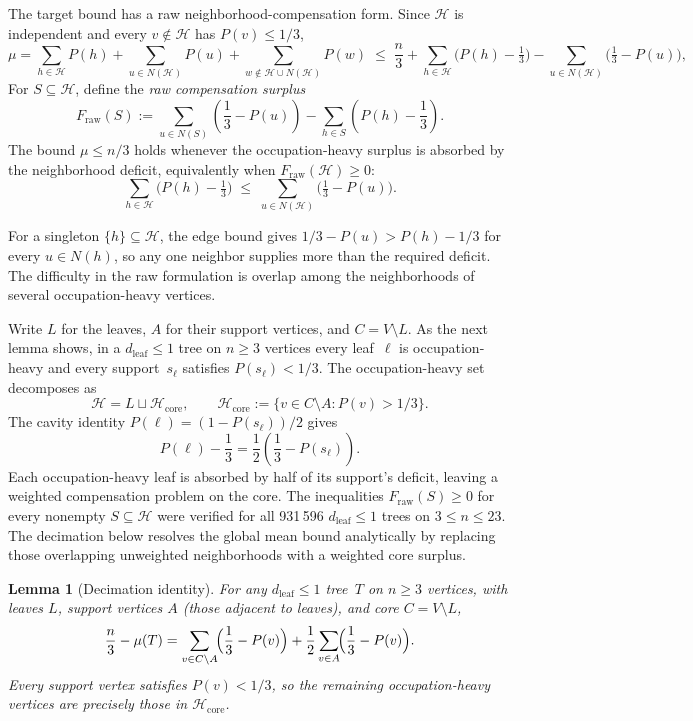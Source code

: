 \documentclass[12pt,oneside]{article}
\newtheorem{lemma}[theorem]{Lemma}
\theoremstyle{remark}
\newcommand{\dleaf}{d_{\mathrm{leaf}}}    %
\begin{document}
The target bound has a raw neighborhood-compensation form.
Since $\mathcal H$ is independent and every $v \notin \mathcal H$ has $P(v) \le 1/3$,
\[
  \mu
  = \sum_{h \in \mathcal H}\! P(h) + \sum_{u \in N(\mathcal H)}\! P(u) + \sum_{w \notin \mathcal H \cup N(\mathcal H)}\! P(w)
  \;\le\; \frac{n}{3} + \sum_{h \in \mathcal H}\!\bigl(P(h) - \tfrac{1}{3}\bigr) - \sum_{u \in N(\mathcal H)}\!\bigl(\tfrac{1}{3} - P(u)\bigr),
\]
For $S\subseteq\mathcal H$, define the \emph{raw compensation surplus}
\[
  F_{\mathrm{raw}}(S)
  :=\sum_{u\in N(S)}\!\left(\frac13-P(u)\right)
  -\sum_{h\in S}\!\left(P(h)-\frac13\right).
\]
The bound $\mu \le n/3$ holds whenever the occupation-heavy surplus is absorbed by the neighborhood deficit, equivalently when $F_{\mathrm{raw}}(\mathcal H)\ge0$:
\begin{equation}\label{eq:whnc}
  \sum_{h \in \mathcal H}\!\bigl(P(h) - \tfrac{1}{3}\bigr)
  \;\le\;
  \sum_{u \in N(\mathcal H)}\!\bigl(\tfrac{1}{3} - P(u)\bigr).
\end{equation}

For a singleton $\{h\}\subseteq\mathcal H$, the edge bound gives
$1/3-P(u)>P(h)-1/3$ for every $u\in N(h)$, so any one neighbor supplies more than the required deficit.
The difficulty in the raw formulation is overlap among the neighborhoods of several occupation-heavy vertices.

Write $L$ for the leaves, $A$ for their support vertices, and $C=V\setminus L$.
As the next lemma shows, in a $\dleaf\le1$ tree on $n\ge3$ vertices every leaf~$\ell$ is occupation-heavy and every support~$s_\ell$ satisfies $P(s_\ell)<1/3$.
The occupation-heavy set decomposes as
\[
  \mathcal H=L\sqcup\mathcal H_{\mathrm{core}},
  \qquad
  \mathcal H_{\mathrm{core}}:=\{v\in C\setminus A:P(v)>1/3\}.
\]
The cavity identity $P(\ell)=(1-P(s_\ell))/2$ gives
\[
  P(\ell)-\frac13
  =\frac12\left(\frac13-P(s_\ell)\right).
\]
Each occupation-heavy leaf is absorbed by half of its support's deficit, leaving a weighted compensation problem on the core.
The inequalities $F_{\mathrm{raw}}(S)\ge0$ for every nonempty $S\subseteq\mathcal H$ were verified for all 931\,596 $\dleaf\le1$ trees on $3\le n\le23$.
The decimation below resolves the global mean bound analytically by replacing those overlapping unweighted neighborhoods with a weighted core surplus.

\begin{lemma}[Decimation identity]\label{lem:decimation}
For any $\dleaf \le 1$ tree~$T$ on $n\ge3$ vertices, with leaves $L$, support vertices $A$ (those adjacent to leaves), and core $C = V \setminus L$,
\[
  \frac{n}{3} - \mu(T)
  = \sum_{v \in C \setminus A}\!\Bigl(\frac{1}{3} - P(v)\Bigr)
  + \frac{1}{2}\sum_{v \in A}\!\Bigl(\frac{1}{3} - P(v)\Bigr).
\]
Every support vertex satisfies $P(v) < 1/3$, so the remaining occupation-heavy vertices are precisely those in $\mathcal H_{\mathrm{core}}$.
\end{lemma}
\end{document}
